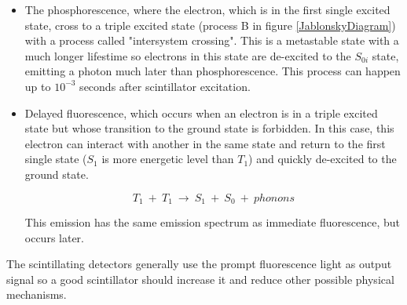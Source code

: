 \begin{itemize}
\item{} The phosphorescence, where the electron, which is in the first single excited state, cross to a triple excited state (process B in figure \ref{JablonskyDiagram}) with a process called "intersystem crossing". This is a metastable state with a much longer lifestime so electrons in this state are de-excited to the $S_{0i}$ state, emitting a photon much later than phosphorescence. This process can happen up to $10^{-3}$ seconds after scintillator excitation.

\item{} Delayed fluorescence, which occurs when an electron is in a triple excited state but whose transition to the ground state is forbidden. In this case, this electron can interact with another in the same state and return to the first single state ($S_{1}$ is more energetic level than $T_{1}$) and quickly de-excited to the ground state. 

$$T_{1} ~+~ T_{1}~ \longrightarrow ~ S_{1} ~+~ S_{0} ~+~ phonons$$

This emission has the same emission spectrum as immediate fluorescence, but occurs later.

\end{itemize}

The scintillating detectors generally use the prompt fluorescence light as output signal so a good scintillator should increase it and reduce other possible physical mechanisms.